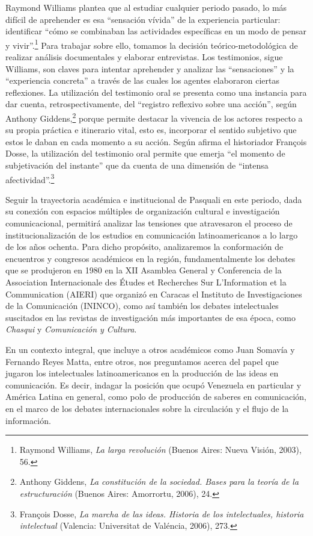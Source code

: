 \documentclass{tufte-handout}
\begin{document}
Raymond Williams plantea que al estudiar cualquier periodo pasado, lo
más difícil de aprehender es esa ``sensación vívida'' de la experiencia
particular: identificar ``cómo se combinaban las actividades específicas
en un modo de pensar y vivir''.\footnote{Raymond Williams, \emph{La
  larga revolución} (Buenos Aires: Nueva Visión, 2003), 56.} Para
trabajar sobre ello, tomamos la decisión teórico-metodológica de
realizar análisis documentales y elaborar entrevistas. Los testimonios,
sigue Williams, son claves para intentar aprehender y analizar las
``sensaciones'' y la ``experiencia concreta'' a través de las cuales los
agentes elaboraron ciertas reflexiones. La utilización del testimonio
oral se presenta como una instancia para dar cuenta, retrospectivamente,
del ``registro reflexivo sobre una acción'', según Anthony
Giddens,\footnote{Anthony Giddens, \emph{La constitución de la sociedad.
  Bases para la teoría de la estructuración} (Buenos Aires: Amorrortu,
  2006), 24.} porque permite destacar la vivencia de los actores
respecto a su propia práctica e itinerario vital, esto es, incorporar el
sentido subjetivo que estos le daban en cada momento a su acción. Según
afirma el historiador François Dosse, la utilización del testimonio oral
permite que emerja ``el momento de subjetivación del instante'' que da
cuenta de una dimensión de ``intensa afectividad''.\footnote{François
  Dosse, \emph{La marcha de las ideas. Historia de los intelectuales,
  historia intelectual} (Valencia: Universitat de Valéncia, 2006), 273.}

Seguir la trayectoria académica e institucional de Pasquali en este
periodo, dada su conexión con espacios múltiples de organización
cultural e investigación comunicacional, permitirá analizar las
tensiones que atravesaron el proceso de institucionalización de los
estudios en comunicación latinoamericanos a lo largo de los años
ochenta. Para dicho propósito, analizaremos la conformación de
encuentros y congresos académicos en la región, fundamentalmente los
debates que se produjeron en 1980 en la XII Asamblea General y
Conferencia de la Association Internacionale des Études et Recherches
Sur L'Information et la Communication (AIERI) que organizó en Caracas el
Instituto de Investigaciones de la Comunicación (ININCO), como así
también los debates intelectuales suscitados en las revistas de
investigación más importantes de esa época, como \emph{Chasqui} y
\emph{Comunicación y Cultura}.

En un contexto integral, que incluye a otros académicos como Juan
Somavía y Fernando Reyes Matta, entre otros, nos preguntamos acerca del
papel que jugaron los intelectuales latinoamericanos en la producción de
las ideas en comunicación. Es decir, indagar la posición que ocupó
Venezuela en particular y América Latina en general, como polo de
producción de saberes en comunicación, en el marco de los debates
internacionales sobre la circulación y el flujo de la información.
\end{document}
